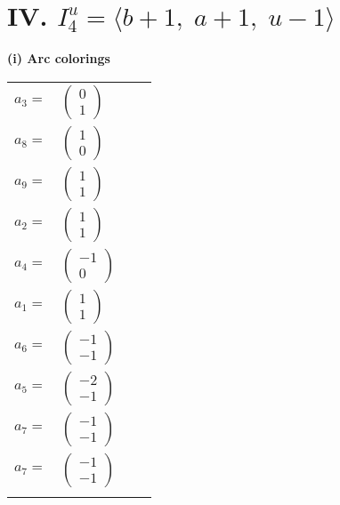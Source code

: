 \documentclass[1p]{elsarticle_modified}
\theoremstyle{definition}
\begin{document}
\centering \section*{IV. $I^u_{4}= \langle b+1,\;a+1,\;u-1 \rangle$}
\flushleft \textbf{(i) Arc colorings}\\
\begin{tabular}{m{7pt} m{180pt} m{7pt} m{180pt} }
\flushright $a_{3}=$&$\begin{pmatrix}0\\1\end{pmatrix}$ \\
\flushright $a_{8}=$&$\begin{pmatrix}1\\0\end{pmatrix}$ \\
\flushright $a_{9}=$&$\begin{pmatrix}1\\1\end{pmatrix}$ \\
\flushright $a_{2}=$&$\begin{pmatrix}1\\1\end{pmatrix}$ \\
\flushright $a_{4}=$&$\begin{pmatrix}-1\\0\end{pmatrix}$ \\
\flushright $a_{1}=$&$\begin{pmatrix}1\\1\end{pmatrix}$ \\
\flushright $a_{6}=$&$\begin{pmatrix}-1\\-1\end{pmatrix}$ \\
\flushright $a_{5}=$&$\begin{pmatrix}-2\\-1\end{pmatrix}$ \\
\flushright $a_{7}=$&$\begin{pmatrix}-1\\-1\end{pmatrix}$\\ \flushright $a_{7}=$&$\begin{pmatrix}-1\\-1\end{pmatrix}$\\&\end{tabular}
\end{document}
